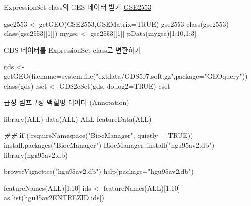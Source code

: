 \documentclass[
]{book}
\newenvironment{Shaded}{\begin{snugshade}}{\end{snugshade}}
\newcommand{\AttributeTok}[1]{\textcolor[rgb]{0.77,0.63,0.00}{#1}}
\newcommand{\ConstantTok}[1]{\textcolor[rgb]{0.00,0.00,0.00}{#1}}
\newcommand{\ControlFlowTok}[1]{\textcolor[rgb]{0.13,0.29,0.53}{\textbf{#1}}}
\newcommand{\DecValTok}[1]{\textcolor[rgb]{0.00,0.00,0.81}{#1}}
\newcommand{\DocumentationTok}[1]{\textcolor[rgb]{0.56,0.35,0.01}{\textbf{\textit{#1}}}}
\newcommand{\FunctionTok}[1]{\textcolor[rgb]{0.00,0.00,0.00}{#1}}
\newcommand{\NormalTok}[1]{#1}
\newcommand{\OtherTok}[1]{\textcolor[rgb]{0.56,0.35,0.01}{#1}}
\newcommand{\SpecialCharTok}[1]{\textcolor[rgb]{0.00,0.00,0.00}{#1}}
\newcommand{\StringTok}[1]{\textcolor[rgb]{0.31,0.60,0.02}{#1}}
\begin{document}
ExpressionSet class의 GES 데이터 받기 \href{https://www.ncbi.nlm.nih.gov/geo/query/acc.cgi?acc=GSE2553}{GSE2553}

\begin{Shaded}
\begin{Highlighting}[]
\NormalTok{gse2553 }\OtherTok{\textless{}{-}} \FunctionTok{getGEO}\NormalTok{(}\StringTok{\textquotesingle{}GSE2553\textquotesingle{}}\NormalTok{,}\AttributeTok{GSEMatrix=}\ConstantTok{TRUE}\NormalTok{)}
\NormalTok{gse2553}
\FunctionTok{class}\NormalTok{(gse2553)}
\FunctionTok{class}\NormalTok{(gse2553[[}\DecValTok{1}\NormalTok{]])}
\NormalTok{mygse }\OtherTok{\textless{}{-}}\NormalTok{ gse2553[[}\DecValTok{1}\NormalTok{]]}
\FunctionTok{pData}\NormalTok{(mygse)[}\DecValTok{1}\SpecialCharTok{:}\DecValTok{10}\NormalTok{,}\DecValTok{1}\SpecialCharTok{:}\DecValTok{3}\NormalTok{]}
\end{Highlighting}
\end{Shaded}

GDS 데이터를 ExpressionSet class로 변환하기

\begin{Shaded}
\begin{Highlighting}[]
\NormalTok{gds }\OtherTok{\textless{}{-}} \FunctionTok{getGEO}\NormalTok{(}\AttributeTok{filename=}\FunctionTok{system.file}\NormalTok{(}\StringTok{"extdata/GDS507.soft.gz"}\NormalTok{,}\AttributeTok{package=}\StringTok{"GEOquery"}\NormalTok{))}
\FunctionTok{class}\NormalTok{(gds)}
\NormalTok{eset }\OtherTok{\textless{}{-}} \FunctionTok{GDS2eSet}\NormalTok{(gds, }\AttributeTok{do.log2=}\ConstantTok{TRUE}\NormalTok{)}
\NormalTok{eset}
\end{Highlighting}
\end{Shaded}

급성 림프구성 백혈병 데이터 (Annotation)

\begin{Shaded}
\begin{Highlighting}[]
\FunctionTok{library}\NormalTok{(ALL)}
\FunctionTok{data}\NormalTok{(ALL)}
\NormalTok{ALL}
\FunctionTok{featureData}\NormalTok{(ALL)}

\DocumentationTok{\#\# }
\ControlFlowTok{if}\NormalTok{ (}\SpecialCharTok{!}\FunctionTok{requireNamespace}\NormalTok{(}\StringTok{"BiocManager"}\NormalTok{, }\AttributeTok{quietly =} \ConstantTok{TRUE}\NormalTok{))}
    \FunctionTok{install.packages}\NormalTok{(}\StringTok{"BiocManager"}\NormalTok{)}
\NormalTok{BiocManager}\SpecialCharTok{::}\FunctionTok{install}\NormalTok{(}\StringTok{"hgu95av2.db"}\NormalTok{)}
\FunctionTok{library}\NormalTok{(hgu95av2.db)}

\FunctionTok{browseVignettes}\NormalTok{(}\StringTok{"hgu95av2.db"}\NormalTok{)}
\FunctionTok{help}\NormalTok{(}\AttributeTok{package=}\StringTok{"hgu95av2.db"}\NormalTok{)}

\FunctionTok{featureNames}\NormalTok{(ALL)[}\DecValTok{1}\SpecialCharTok{:}\DecValTok{10}\NormalTok{]}
\NormalTok{ids }\OtherTok{\textless{}{-}} \FunctionTok{featureNames}\NormalTok{(ALL)[}\DecValTok{1}\SpecialCharTok{:}\DecValTok{10}\NormalTok{]}
\FunctionTok{as.list}\NormalTok{(hgu95av2ENTREZID[ids])}
\end{Highlighting}
\end{Shaded}
\end{document}
